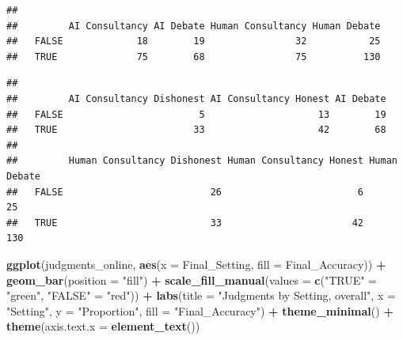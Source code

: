 \documentclass[
]{article}
\newenvironment{Shaded}{\begin{snugshade}}{\end{snugshade}}
\newcommand{\AttributeTok}[1]{\textcolor[rgb]{0.13,0.29,0.53}{#1}}
\newcommand{\FunctionTok}[1]{\textcolor[rgb]{0.13,0.29,0.53}{\textbf{#1}}}
\newcommand{\NormalTok}[1]{#1}
\newcommand{\OtherTok}[1]{\textcolor[rgb]{0.56,0.35,0.01}{#1}}
\newcommand{\SpecialCharTok}[1]{\textcolor[rgb]{0.81,0.36,0.00}{\textbf{#1}}}
\newcommand{\StringTok}[1]{\textcolor[rgb]{0.31,0.60,0.02}{#1}}
\begin{document}
\begin{verbatim}
##        
##         AI Consultancy AI Debate Human Consultancy Human Debate
##   FALSE             18        19                32           25
##   TRUE              75        68                75          130
\end{verbatim}

\begin{Shaded}
\end{Shaded}

\begin{verbatim}
##        
##         AI Consultancy Dishonest AI Consultancy Honest AI Debate
##   FALSE                        5                    13        19
##   TRUE                        33                    42        68
##        
##         Human Consultancy Dishonest Human Consultancy Honest Human Debate
##   FALSE                          26                        6           25
##   TRUE                           33                       42          130
\end{verbatim}

\begin{Shaded}
\begin{Highlighting}[]
\FunctionTok{ggplot}\NormalTok{(judgments\_online, }\FunctionTok{aes}\NormalTok{(}\AttributeTok{x =}\NormalTok{ Final\_Setting, }\AttributeTok{fill =}\NormalTok{ Final\_Accuracy)) }\SpecialCharTok{+}
  \FunctionTok{geom\_bar}\NormalTok{(}\AttributeTok{position =} \StringTok{"fill"}\NormalTok{) }\SpecialCharTok{+}
  \FunctionTok{scale\_fill\_manual}\NormalTok{(}\AttributeTok{values =} \FunctionTok{c}\NormalTok{(}\StringTok{"TRUE"} \OtherTok{=} \StringTok{"green"}\NormalTok{, }\StringTok{"FALSE"} \OtherTok{=} \StringTok{"red"}\NormalTok{)) }\SpecialCharTok{+}
  \FunctionTok{labs}\NormalTok{(}\AttributeTok{title =} \StringTok{"Judgments by Setting, overall"}\NormalTok{, }\AttributeTok{x =} \StringTok{"Setting"}\NormalTok{, }\AttributeTok{y =} \StringTok{"Proportion"}\NormalTok{, }\AttributeTok{fill =} \StringTok{"Final\_Accuracy"}\NormalTok{) }\SpecialCharTok{+}
  \FunctionTok{theme\_minimal}\NormalTok{() }\SpecialCharTok{+}
  \FunctionTok{theme}\NormalTok{(}\AttributeTok{axis.text.x =} \FunctionTok{element\_text}\NormalTok{())}
\end{Highlighting}
\end{Shaded}
\end{document}
